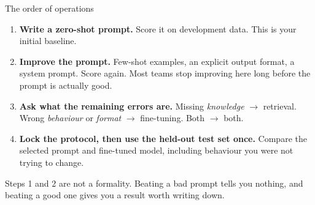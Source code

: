 \documentclass[aspectratio=169,10pt]{beamer}
\begin{document}
\begin{frame}{The order of operations}
  \begin{enumerate}
    \item \textbf{Write a zero-shot prompt.} Score it on development data.
      This is your initial baseline.
      \vspace{0.3em}
    \item \textbf{Improve the prompt.} Few-shot examples, an explicit output
      format, a system prompt. Score again. Most teams stop improving here
      long before the prompt is actually good.
      \vspace{0.3em}
    \item \textbf{Ask what the remaining errors are.} Missing \emph{knowledge}
      $\rightarrow$ retrieval. Wrong \emph{behaviour} or \emph{format}
      $\rightarrow$ fine-tuning. Both $\rightarrow$ both.
      \vspace{0.3em}
    \item \textbf{Lock the protocol, then use the held-out test set once.}
      Compare the selected prompt and fine-tuned model, including behaviour
      you were not trying to change.
  \end{enumerate}
  \vspace{0.5em}
  \begin{takeaway}
    Steps 1 and 2 are not a formality. Beating a bad prompt tells you nothing,
    and beating a good one gives you a result worth writing down.
  \end{takeaway}
\end{frame}
\end{document}
